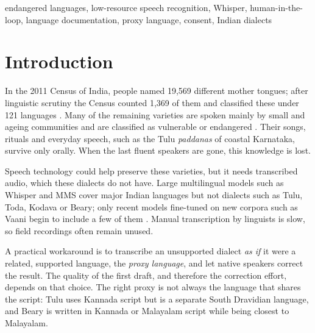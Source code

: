 \documentclass[conference]{IEEEtran}
\begin{document}
\begin{IEEEkeywords}
endangered languages, low-resource speech recognition, Whisper, human-in-the-loop, language documentation, proxy language, consent, Indian dialects
\end{IEEEkeywords}

\section{Introduction}
In the 2011 Census of India, people named 19,569 different mother tongues; after linguistic scrutiny the Census counted 1,369 of them and classified these under 121 languages \cite{census2011}. Many of the remaining varieties are spoken mainly by small and ageing communities and are classified as vulnerable or endangered \cite{unesco2010}. Their songs, rituals and everyday speech, such as the Tulu \emph{paddanas} of coastal Karnataka, survive only orally. When the last fluent speakers are gone, this knowledge is lost.

Speech technology could help preserve these varieties, but it needs transcribed audio, which these dialects do not have. Large multilingual models such as Whisper \cite{radford2023} and MMS \cite{pratap2024} cover major Indian languages but not dialects such as Tulu, Toda, Kodava or Beary; only recent models fine-tuned on new corpora such as Vaani begin to include a few of them \cite{sravaani}. Manual transcription by linguists is slow, so field recordings often remain unused.

A practical workaround is to transcribe an unsupported dialect \emph{as if} it were a related, supported language, the \emph{proxy language}, and let native speakers correct the result. The quality of the first draft, and therefore the correction effort, depends on that choice. The right proxy is not always the language that shares the script: Tulu uses Kannada script but is a separate South Dravidian language, and Beary is written in Kannada or Malayalam script while being closest to Malayalam.
\end{document}
